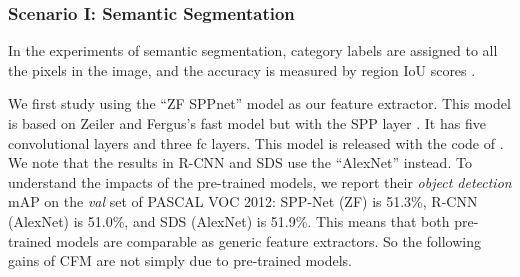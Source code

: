 \documentclass[10pt,twocolumn,letterpaper]{article}
\begin{document}
\subsubsection*{Scenario I: Semantic Segmentation}


In the experiments of semantic segmentation, category labels are assigned to all the pixels in the image, and the accuracy is measured by region IoU scores \cite{everingham2010pascal}.

We first study using the ``ZF SPPnet'' model \cite{he2014spatial} as our feature extractor. This model is based on Zeiler and Fergus's fast model \cite{zeiler2013visualizing} but with the SPP layer \cite{he2014spatial}. It has five convolutional layers and three fc layers. This model is released with the code of \cite{he2014spatial}. We note that the results in R-CNN \cite{girshick2013rich} and SDS \cite{hariharan2014simultaneous} use the ``AlexNet'' \cite{krizhevsky2012imagenet} instead. To understand the impacts of the pre-trained models, we report their \emph{object detection} mAP on the \emph{val} set of PASCAL VOC 2012: SPP-Net (ZF) is 51.3\%, R-CNN (AlexNet) is 51.0\%, and SDS (AlexNet) is 51.9\%. This means that both pre-trained models are comparable as generic feature extractors. So the following gains of CFM are not simply due to pre-trained models.
\end{document}
